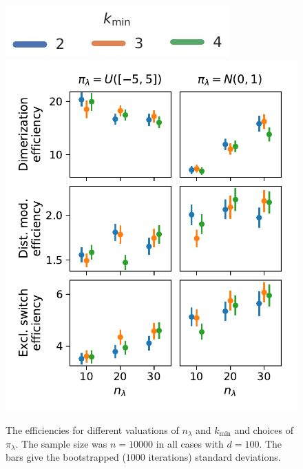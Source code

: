 \begin{figure}[htb]
    \centering
    \includegraphics[scale=.7]{gfx/legend.pdf}\\
    \includegraphics[scale=.5]{gfx/efficiency_priors.pdf}
	\caption[Influence of algorithmic parameters on estimates]{The efficiencies for different valuations of ${n}_{\lambda}$ and ${k}_{\min} $
	and choices of ${\pi}_{\lambda}$. The sample size was $n=\num{10000}$ in all cases
    with $d=100$.
    The bars give the bootstrapped ($1000$ iterations) standard deviations.\label{fig:efficiencies_prior}}
\end{figure}

